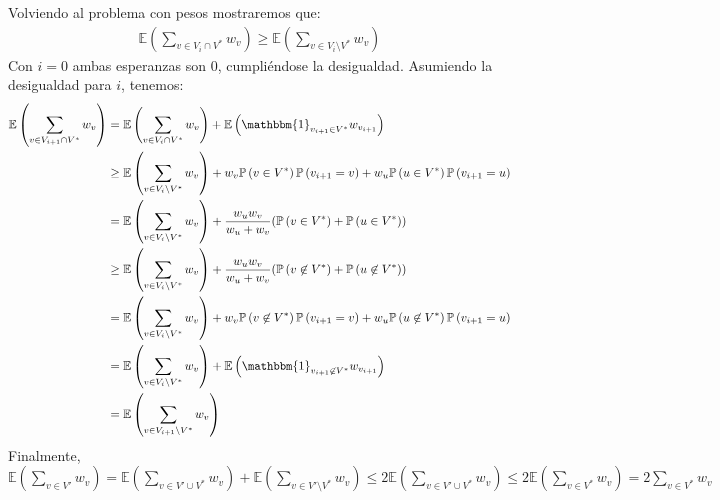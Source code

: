 \documentclass[dcc,uchile]{fcfmcourse}
\theoremstyle{plain}
\theoremstyle{definition}
\begin{document}
\begin{problems}
Volviendo al problema con pesos mostraremos que:
\begin{align*}
    \mathbb{E}\left( \sum_{v\in V_{i}\cap V^*} w_{v}\right) \ge \mathbb{E}\left( \sum_{v\in V_{i}\setminus V^*} w_{v}\right)
\end{align*}
Con $i=0$ ambas esperanzas son $0$, cumpliéndose la desigualdad. Asumiendo la desigualdad para $i$, tenemos:
\begin{align*}
    \mathbb{E}\left( \sum_{v\in V_{i+1}\cap V^*} w_{v}\right) &= \mathbb{E}\left( \sum_{v\in V_{i}\cap V^*} w_{v}\right) + \mathbb{E}\left(\mathbbm{1}_{v_{i+1}\in V^*}w_{v_{i+1}}\right) \\
    & \ge \mathbb{E}\left( \sum_{v\in V_{i}\setminus V^*} w_{v}\right) + w_{v}\mathbb{P}\left(v\in V^*\right)\mathbb{P}\left(v_{i+1} = v\right) + w_{u}\mathbb{P}\left(u\in V^*\right)\mathbb{P}\left(v_{i+1} = u\right)\\
    &= \mathbb{E}\left( \sum_{v\in V_{i}\setminus V^*} w_{v}\right) + \frac{w_{u}w_{v}}{w_{u}+w_{v}} (\mathbb{P}\left(v\in V^*\right)+\mathbb{P}\left(u\in V^*\right))\\
    & \ge \mathbb{E}\left( \sum_{v\in V_{i}\setminus V^*} w_{v}\right) + \frac{w_{u}w_{v}}{w_{u}+w_{v}} (\mathbb{P}\left(v\not\in V^*\right)+\mathbb{P}\left(u\not\in V^*\right))\\
     & = \mathbb{E}\left( \sum_{v\in V_{i}\setminus V^*} w_{v}\right) + w_{v}\mathbb{P}\left(v\not\in V^*\right)\mathbb{P}\left(v_{i+1} = v\right) + w_{u}\mathbb{P}\left(u\not\in V^*\right)\mathbb{P}\left(v_{i+1} = u\right)\\
     &= \mathbb{E}\left( \sum_{v\in V_{i}\setminus V^*} w_{v}\right) + \mathbb{E}\left(\mathbbm{1}_{v_{i+1}\not\in V^*}w_{v_{i+1}}\right) \\
     &= \mathbb{E}\left( \sum_{v\in V_{i+1}\setminus V^*} w_{v}\right)
\end{align*}
Finalmente, $\mathbb{E}\left( \sum_{v\in V'} w_{v}\right) = \mathbb{E}\left( \sum_{v\in V'\cup V^*} w_{v}\right) + \mathbb{E}\left( \sum_{v\in V'\setminus V^*} w_{v}\right) \le 2 \mathbb{E}\left(\sum_{v\in V'\cup V^*} w_{v}\right) \le 2 \mathbb{E}\left(\sum_{v\in V^*} w_{v}\right) = 2\sum_{v\in V^*} w_{v}$


\end{problems}
\end{document}

